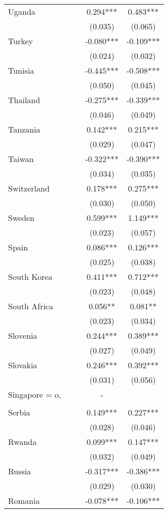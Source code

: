 \documentclass[]{article}
\begin{document}
\begin{tabular}{lcccc}
Uganda &  &  & 0.294*** & 0.483*** \\
 &  &  & (0.035) & (0.065) \\
Turkey &  &  & -0.080*** & -0.109*** \\
 &  &  & (0.024) & (0.032) \\
Tunisia &  &  & -0.445*** & -0.508*** \\
 &  &  & (0.050) & (0.045) \\
Thailand &  &  & -0.275*** & -0.339*** \\
 &  &  & (0.046) & (0.049) \\
Tanzania &  &  & 0.142*** & 0.215*** \\
 &  &  & (0.029) & (0.047) \\
Taiwan &  &  & -0.322*** & -0.390*** \\
 &  &  & (0.034) & (0.035) \\
Switzerland &  &  & 0.178*** & 0.275*** \\
 &  &  & (0.030) & (0.050) \\
Sweden &  &  & 0.599*** & 1.149*** \\
 &  &  & (0.023) & (0.057) \\
Spain &  &  & 0.086*** & 0.126*** \\
 &  &  & (0.025) & (0.038) \\
South Korea &  &  & 0.411*** & 0.712*** \\
 &  &  & (0.023) & (0.048) \\
South Africa &  &  & 0.056** & 0.081** \\
 &  &  & (0.023) & (0.034) \\
Slovenia &  &  & 0.244*** & 0.389*** \\
 &  &  & (0.027) & (0.049) \\
Slovakia &  &  & 0.246*** & 0.392*** \\
 &  &  & (0.031) & (0.056) \\
Singapore = o, &  &  & - &  \\
 &  &  &  &  \\
Serbia &  &  & 0.149*** & 0.227*** \\
 &  &  & (0.028) & (0.046) \\
Rwanda &  &  & 0.099*** & 0.147*** \\
 &  &  & (0.032) & (0.049) \\
Russia &  &  & -0.317*** & -0.386*** \\
 &  &  & (0.029) & (0.030) \\
Romania &  &  & -0.078*** & -0.106*** \\

\end{tabular}
\end{document}
